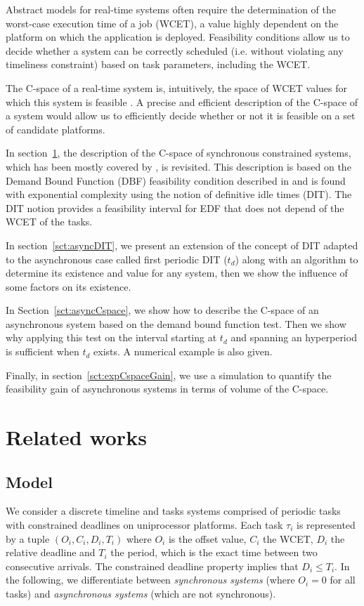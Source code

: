 \documentclass[conference]{IEEEtran}
\begin{document}
	Abstract models for real-time systems often require the determination of the
	worst-case execution time of a job (WCET), a value highly dependent on the
	platform on which the application is deployed. Feasibility conditions allow us to
	decide whether a system can be correctly scheduled (i.e. without violating any
	timeliness constraint) based on task parameters, including the WCET.

	The \mbox{C-space} of a real-time system is, intuitively,
	the space of WCET values for which this system is feasible
	\cite{bini2004schedulability,george2009characterization}. A precise and efficient description of the C-space of a system would allow us to efficiently decide whether or not it is feasible on a set of candidate platforms.

	In section~\ref{sct:relatedWorks}, the description of the C-space of synchronous
	constrained systems, which has been mostly covered by \cite{george2009characterization}, is revisited.
	This description is based on the Demand Bound Function (DBF) feasibility condition described in
	\cite{baruah1999generalized,baruah1990algorithms} and is found with exponential complexity using
	the notion of definitive idle times (DIT). The DIT notion provides a feasibility interval for EDF that does not depend of the WCET of the tasks.

	In section~\ref{sct:asyncDIT}, we present an extension of the concept of DIT adapted to the
	asynchronous case called first periodic DIT
	($t_d$) along with an algorithm to determine its existence and value for any system,
	then we show the influence of some factors on its existence.

	In Section~\ref{sct:asyncCspace}, we show how to describe the C-space of an asynchronous
	system based on the demand bound function test. Then we show why applying this
	test on the interval starting at $t_d$
	and spanning an hyperperiod is sufficient when $t_d$ exists. A
	numerical example is also given.

	Finally, in section~\ref{sct:expCspaceGain}, we use a simulation to quantify the feasibility
	gain of asynchronous systems in terms of volume of the C-space.

\section{Related works}
\label{sct:relatedWorks}


	\subsection{Model}
		We consider a discrete timeline and tasks systems comprised of periodic
		tasks with constrained deadlines on uniprocessor platforms. Each task
		$\tau_i$ is represented by a tuple $(O_i, C_i, D_i, T_i)$ where $O_i$ is the offset value,
		$C_i$ the WCET, $D_i$ the relative deadline and $T_i$ the period, which is the exact time between two consecutive arrivals.
		The constrained deadline property implies that $D_i \leq T_i$. In
		the following, we differentiate between \emph{synchronous systems} (where $O_i
		= 0$ for all tasks) and \emph{asynchronous systems} (which are not synchronous).
\end{document}
